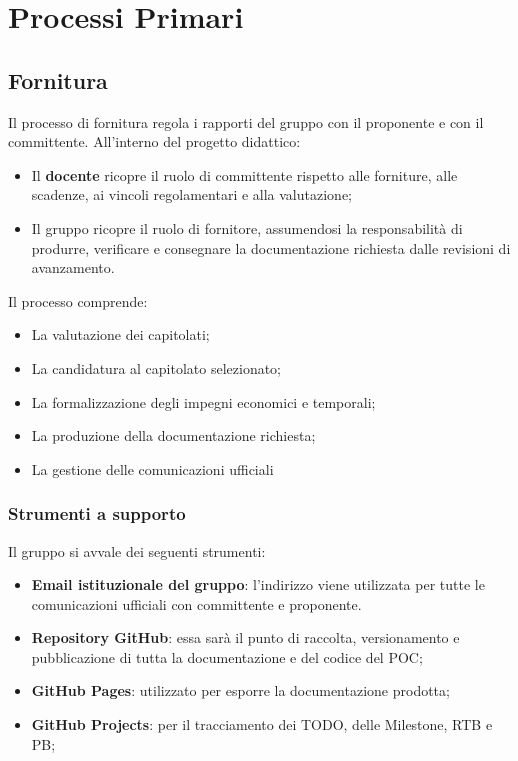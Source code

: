 \section{Processi Primari}
\subsection{Fornitura}
Il processo di fornitura regola i rapporti del gruppo con il proponente e con il committente. All'interno del progetto didattico:
\begin{itemize}
	\item Il \textbf{docente} ricopre il ruolo di committente rispetto alle forniture, alle scadenze, ai vincoli regolamentari e alla valutazione;
	\item Il gruppo \nomegruppo ricopre il ruolo di fornitore, assumendosi la responsabilità di produrre, verificare e consegnare la documentazione richiesta dalle revisioni di avanzamento.
\end{itemize}

Il processo comprende:
\begin{itemize}
	\item La valutazione dei capitolati;
	\item La candidatura al capitolato selezionato;
	\item La formalizzazione degli impegni economici e temporali;
	\item La produzione della documentazione richiesta;
	\item La gestione delle comunicazioni ufficiali
\end{itemize}

\subsubsection{Strumenti a supporto}
Il gruppo si avvale dei seguenti strumenti:
\begin{itemize}
	\item \textbf{Email istituzionale del gruppo}: l'indirizzo \emailgruppo viene utilizzata per tutte le comunicazioni ufficiali con committente e proponente.
	\item \textbf{Repository GitHub}: essa sarà il punto di raccolta, versionamento e pubblicazione di tutta la documentazione e del codice del POC;
	\item \textbf{GitHub Pages}: utilizzato per esporre la documentazione prodotta;
	\item \textbf{GitHub Projects}: per il tracciamento dei TODO, delle Milestone, RTB e PB;
\end{itemize}

